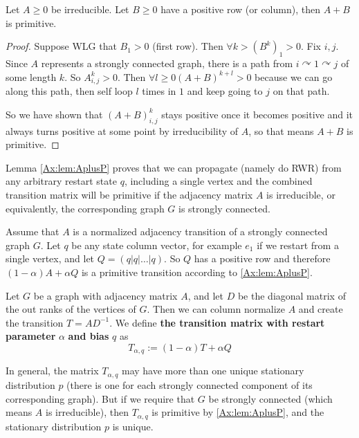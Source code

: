 
\begin{lemma}
\label{Ax:lem:AplusP}
Let $A \geq 0$ be irreducible. Let $B \geq 0$ have a positive row (or column),
then $A + B$ is primitive.
\begin{proof}
Suppose WLG that $B_1 > 0$ (first row). Then $\forall k \gt (B^k)_1 \gt 0$.
Fix $i,j$.
Since $A$ represents a strongly connected graph, there is a path from $i
\curvearrowright 1 \curvearrowright j$ of some length $k$. So $A^k_{i,j}>0$.
Then $\forall l \geq 0 (A + B)^{k+l} \gt 0$ because we can go along this path,
then self loop $l$ times in $1$ and keep going to $j$ on that path.

So we have shown that $(A+B)^k_{i,j}$ stays positive once it becomes positive
and it always turns positive at some point by irreducibility of $A$, so that
means $A+B$ is primitive.
\end{proof}
\end{lemma}

\begin{remark}
\label{Ax:rem:AplusP}
Lemma \ref{Ax:lem:AplusP} proves that we can propagate (namely do RWR) from any arbitrary restart
state $q$, including a single vertex and the combined transition matrix will be
primitive if the adjacency matrix $A$ is irreducible, or
equivalently, the corresponding graph $G$ is strongly connected.


Assume that $A$ is a normalized adjacency transition of a strongly
connected graph $G$.
Let $q$ be any state column vector, for example $e_1$ if we restart
from a single vertex, and let $Q = (q | q | \dots | q)$.
So $Q$ has a positive row and therefore $(1-\alpha)A + \alpha Q$ is a primitive
transition according to \ref{Ax:lem:AplusP}.

\end{remark}

\begin{mydef}
\label{Ax:def:Transitionbiased}
Let $G$ be a graph with adjacency matrix $A$, and let $D$ be the
diagonal matrix of the out ranks of the vertices of $G$. Then we can
column normalize $A$ and create the transition $T = AD^{-1}$.
We define \textbf{the transition matrix with restart parameter}
$\alpha$ \textbf{and bias} $q$ as
\[
T_{\alpha, q} :=
(1 - \alpha)T + \alpha Q
\]
\end{mydef}

In general, 
the matrix $T_{\alpha,q}$ may have more than one unique stationary distribution $p$ 
(there is one for each strongly connected
component of its corresponding graph). But if we require that $G$ be
strongly connected (which means $A$ is irreducible),
then $T_{\alpha,q}$ is primitive by \ref{Ax:lem:AplusP}, and the
stationary distribution $p$ is unique.

